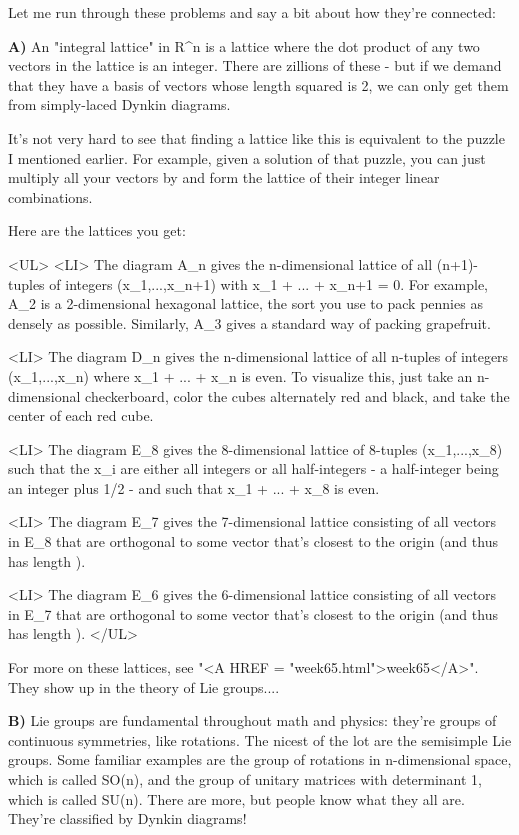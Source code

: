 Let me run through these problems and say a bit about how they're
connected:

\textbf{A)}
An "integral lattice" in R^{n} 
is a lattice where the dot product 
of any two vectors in the lattice is an integer.   There are zillions
of these - but if we demand that they have a basis of vectors whose
length squared is 2, we can only get them from simply-laced Dynkin 
diagrams.

It's not very hard to see that finding a lattice like this is equivalent 
to the puzzle I mentioned earlier.  For example, given a solution of 
that puzzle, you can just multiply all your vectors by  and
form the lattice of their integer linear combinations.  

Here are the lattices you get:

<UL>
<LI>
The diagram A_{n} gives the n-dimensional lattice 
of all (n+1)-tuples of integers (x_{1},...,x_{n+1}) with
x_{1} + ... + x_{n+1} = 0.
For example, A_{2} is a 2-dimensional hexagonal
lattice, the sort you use to pack pennies as densely as
possible.  Similarly, A_{3} gives a standard way of packing 
grapefruit.

<LI>
The diagram D_{n} gives the n-dimensional lattice
of all n-tuples of integers (x_{1},...,x_{n}) where
x_{1} + ... + x_{n} 
is even.
To visualize this, just take an n-dimensional checkerboard,
color the cubes alternately red and black, and take the center of
each red cube.  

<LI>
The diagram E_{8} gives the 8-dimensional lattice of
8-tuples (x_{1},...,x_{8}) such
that the x_{i} are either all integers or all half-integers - a
half-integer being an integer plus 1/2 - and such that
x_{1} + ... + x_{8} 
is even.

<LI>
The diagram E_{7} gives the 7-dimensional lattice consisting
of all vectors in E_{8} that are orthogonal to some vector
that's closest to the origin (and thus has length ).

<LI>
The diagram E_{6} gives the 6-dimensional lattice consisting
of all vectors in E_{7} that are orthogonal to some vector
that's closest to the origin (and thus has length ).
</UL>

For more on these lattices, see "<A HREF = "week65.html">week65</A>".
They show up in the theory of Lie groups....

\textbf{B)} Lie groups are fundamental throughout math and physics: they're
groups of continuous symmetries, like rotations.  The nicest of the
lot are the semisimple Lie groups.  Some familiar examples are the 
group of rotations in n-dimensional space, which is called SO(n), 
and the group of unitary matrices with determinant 1, which is 
called SU(n).  There are more, but people know what they all are.
They're classified by Dynkin diagrams!  

